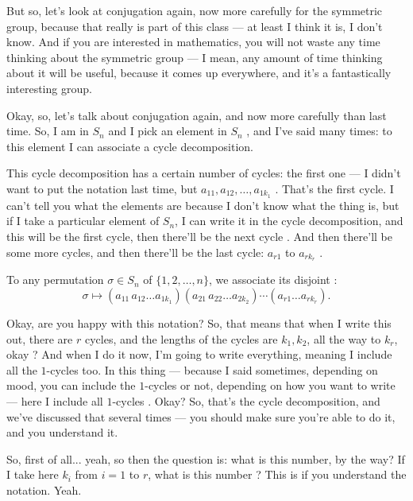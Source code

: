 \begin{speech}[00:30:39 - 00:32:20]
But so, let's look at conjugation again, now more carefully for the symmetric group, because that really is part of this class --- at least I think it is, I don't know. And if you are interested in mathematics, you will not waste any time thinking about the symmetric group --- I mean, any amount of time thinking about it will be useful, because it comes up everywhere, and it's a fantastically interesting group.

Okay, so, let's talk about conjugation again, and now more carefully than last time. So, I am in $S_n$ and I pick an element in $S_n$ , and I've said many times: to this element I can associate a cycle decomposition.

This cycle decomposition has a certain number of cycles: the first one --- I didn't want to put the notation last time, but $a_{11}, a_{12}, \dots, a_{1 k_1}$ . That's the first cycle. I can't tell you what the elements are because I don't know what the thing is, but if I take a particular element of $S_n$, I can write it in the cycle decomposition, and this will be the first cycle, then there'll be the next cycle . And then there'll be some more cycles, and then there'll be the last cycle: $a_{r1}$ to $a_{r k_r}$ .
\end{speech}

\begin{content}
To any permutation $\sigma \in S_n$ of $\{1, 2, \dots, n\}$, we associate its disjoint :
\[
\sigma \longmapsto (a_{11}\, a_{12} \dots a_{1 k_1}) (a_{21}\, a_{22} \dots a_{2 k_2}) \cdots (a_{r1} \dots a_{r k_r}).
\]
\end{content}

\begin{speech}[00:32:20 - 00:33:22]
Okay, are you happy with this notation? So, that means that when I write this out, there are $r$ cycles, and the lengths of the cycles are $k_1, k_2$, all the way to $k_r$, okay ? And when I do it now, I'm going to write everything, meaning I include all the $1$-cycles too. In this thing --- because I said sometimes, depending on mood, you can include the $1$-cycles or not, depending on how you want to write --- here I include all $1$-cycles . Okay? So, that's the cycle decomposition, and we've discussed that several times --- you should make sure you're able to do it, and you understand it.

So, first of all... yeah, so then the question is: what is this number, by the way? If I take here $k_i$ from $i = 1$ to $r$, what is this number ? This is if you understand the notation. Yeah.
\end{speech}

